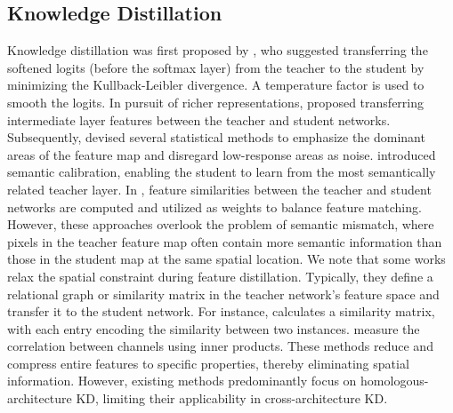 \documentclass[sigconf]{acmart}
\begin{document}
\subsection{Knowledge Distillation}
Knowledge distillation was first proposed by \citet{kd}, who suggested transferring the softened logits (before the softmax layer) from the teacher to the student by minimizing the Kullback-Leibler divergence. A temperature factor is used to smooth the logits. In pursuit of richer representations, \citet{fitnet} proposed transferring intermediate layer features between the teacher and student networks. Subsequently, \citet{at} devised several statistical methods to emphasize the dominant areas of the feature map and disregard low-response areas as noise. \citet{crosslayer} introduced semantic calibration, enabling the student to learn from the most semantically related teacher layer. In \cite{featurematch}, feature similarities between the teacher and student networks are computed and utilized as weights to balance feature matching. However, these approaches overlook the problem of semantic mismatch, where pixels in the teacher feature map often contain more semantic information than those in the student map at the same spatial location. We note that some works \cite{interchannel, pkt, rkd, cckd, ekd} relax the spatial constraint during feature distillation. Typically, they define a relational graph or similarity matrix in the teacher network's feature space and transfer it to the student network. For instance, \citet{sp} calculates a similarity matrix, with each entry encoding the similarity between two instances. \citet{interchannel} measure the correlation between channels using inner products. These methods reduce and compress entire features to specific properties, thereby eliminating spatial information. However, existing methods predominantly focus on homologous-architecture KD, limiting their applicability in cross-architecture KD.
\end{document}
